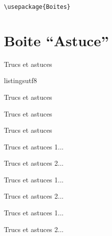 \documentclass[a4paper,12pt]{article}
\begin{document}
		\begin{lstlisting}
\usepackage{Boites}
		\end{lstlisting}



	\section{Boite ``Astuce''}

\begin{code}%
\begin{astuce}
	Trucs et astuces
\end{astuce}listingsutf8
\end{code}

\begin{astuce}
	Trucs et astuces
\end{astuce}%

\begin{code}%
\begin{astuce*}
	Trucs et astuces
\end{astuce*}
\end{code}

\begin{astuce*}
	Trucs et astuces
\end{astuce*}%

\begin{code}%
\begin{astuces}
	\item Trucs et astuces 1...
	\item Trucs et astuces 2...
\end{astuces}
\end{code}

\begin{astuces}
	\item Trucs et astuces 1...
	\item Trucs et astuces 2...
\end{astuces}%

\begin{code}%
\begin{astuces*}
	\item Trucs et astuces 1...
	\item Trucs et astuces 2...
\end{astuces*}
\end{code}
\end{document}
